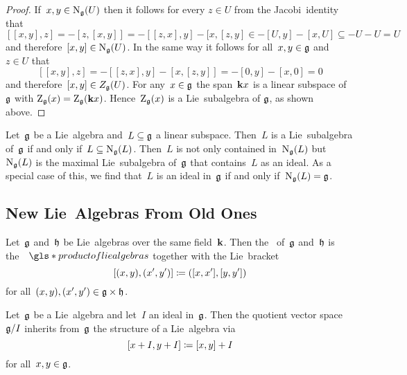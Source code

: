 \begin{proof}
 If~$x, y \in \operatorname{N}_{\mathfrak{g}}(U)$ then it follows for every $z \in U$ from the Jacobi~identity that
 \[
  [[x,y], z]
  =
  - [z, [x,y]]
  =
  - [[z,x], y] - [x, [z,y]
  \in
  - [U, y] - [x, U]
  \subseteq
  - U - U
  =
  U
 \]
 and therefore~$[x,y] \in \operatorname{N}_{\mathfrak{g}}(U)$.
 In the same way it follows for all~$x, y \in \mathfrak{g}$ and~$z \in U$ that
 \[
  [[x,y], z]
  =
  - [[z,x], y] - [x, [z,y]]
  =
  - [0, y] - [x, 0]
  =
  0
 \]
 and therefore~$[x,y] \in Z_{\mathfrak{g}}(U)$.
 For any~$x \in \mathfrak{g}$ the span~$\mathbf{k} x$ is a linear subspace of~$\mathfrak{g}$ with $\operatorname{Z}_{\mathfrak{g}}(x) = \operatorname{Z}_{\mathfrak{g}}(\mathbf{k} x)$.
 Hence~$\operatorname{Z}_{\mathfrak{g}}(x)$ is a Lie~subalgebra of $\mathfrak{g}$, as shown above.
\end{proof}


\begin{remark}
 Let~$\mathfrak{g}$ be a Lie~algebra and~$L \subseteq \mathfrak{g}$ a linear subspace.
 Then~$L$ is a Lie~subalgebra of~$\mathfrak{g}$ if and only if~$L \subseteq \operatorname{N}_{\mathfrak{g}}(L)$.
 Then~$L$ is not only contained in~$\operatorname{N}_{\mathfrak{g}}(L)$ but~$\operatorname{N}_{\mathfrak{g}}(L)$ is the maximal Lie~subalgebra of~$\mathfrak{g}$ that contains~$L$ as an ideal.
 As a special case of this, we find that~$L$ is an ideal in~$\mathfrak{g}$ if and only if~$\operatorname{N}_{\mathfrak{g}}(L) = \mathfrak{g}$.
\end{remark}





\subsection{New Lie~Algebras From Old Ones}


\begin{definition}
  Let~$\mathfrak{g}$ and~$\mathfrak{h}$ be Lie~algebras over the same field~$\kf$.
  Then the \, of~$\mathfrak{g}$ and~$\mathfrak{h}$ is the~{\vectorspace{$\kf$}}~$\gls*{product of lie algebras}$ together with the Lie~bracket
  \[
    [(x,y), (x',y')]
    \coloneqq
    ([x, x'], [y, y'])
  \]
  for all~$(x,y), (x',y') \in \mathfrak{g} \times \mathfrak{h}$.
\end{definition}


\begin{lemma}
  \label{construction of quotient lie algebra}
  Let~$\mathfrak{g}$ be a Lie~algebra and let~$I$ an ideal in~$\mathfrak{g}$.
  Then the quotient vector space~$\mathfrak{g}/I$ inherits from~$\mathfrak{g}$ the structure of a Lie~algebra via
  \[
    [x+I, y+I]
    \coloneqq
    [x,y] + I
  \]
  for all~$x, y \in \mathfrak{g}$.
\end{lemma}



